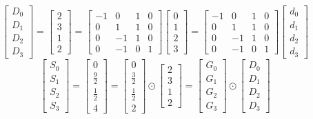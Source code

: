 \documentclass{article}%
\begin{document}
\[%
\left[\begin{matrix}D_{0}\\D_{1}\\D_{2}\\D_{3}\end{matrix}\right] = \left[\begin{matrix}2\\3\\1\\2\end{matrix}\right] = \left[\begin{matrix}-1 & 0 & 1 & 0\\0 & 1 & 1 & 0\\0 & -1 & 1 & 0\\0 & -1 & 0 & 1\end{matrix}\right] \left[\begin{matrix}0\\1\\2\\3\end{matrix}\right] = \left[\begin{matrix}-1 & 0 & 1 & 0\\0 & 1 & 1 & 0\\0 & -1 & 1 & 0\\0 & -1 & 0 & 1\end{matrix}\right] \left[\begin{matrix}d_{0}\\d_{1}\\d_{2}\\d_{3}\end{matrix}\right]%
\]%
\[%
\left[\begin{matrix}S_{0}\\S_{1}\\S_{2}\\S_{3}\end{matrix}\right] = \left[\begin{matrix}0\\\frac{9}{2}\\\frac{1}{2}\\4\end{matrix}\right] = \left[\begin{matrix}0\\\frac{3}{2}\\\frac{1}{2}\\2\end{matrix}\right] \odot \left[\begin{matrix}2\\3\\1\\2\end{matrix}\right] = \left[\begin{matrix}G_{0}\\G_{1}\\G_{2}\\G_{3}\end{matrix}\right] \odot \left[\begin{matrix}D_{0}\\D_{1}\\D_{2}\\D_{3}\end{matrix}\right]%
\]%
\end{document}
